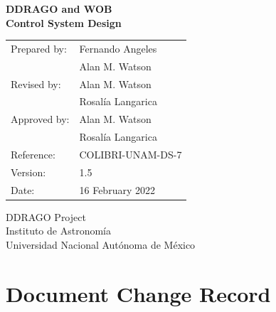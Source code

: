 \documentclass{article}
\begin{document}
\pagestyle{empty}

\pagestyle{empty}

\begin{center}
\Large \bfseries 
DDRAGO and WOB\\
Control System Design
\end{center}

\begin{center}
\begin{tabular}{ll}
Prepared by:&Fernando Angeles\\
&Alan M. Watson\\
Revised by:&Alan M. Watson\\
& Rosalía Langarica\\
Approved by:&Alan M. Watson\\
& Rosalía Langarica\\
Reference:&COLIBRI-UNAM-DS-7\\
Version:&1.5\\
Date:&16 February 2022\\
\end{tabular}
\end{center}

\vspace{\fill}

\begin{center}
DDRAGO Project\\
Instituto de Astronomía\\
Universidad Nacional Autónoma de México
\end{center}

\newpage
\section*{Document Change Record}
\end{document}
